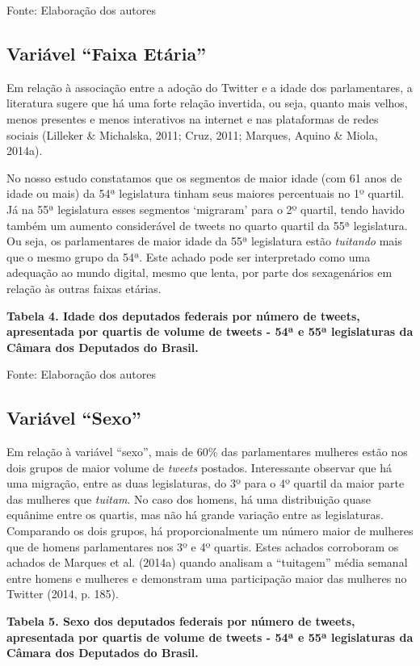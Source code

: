 Fonte: Elaboração dos autores

\subsection{Variável ``Faixa Etária''}

Em relação à associação entre a adoção do Twitter e a idade dos
parlamentares, a literatura sugere que há uma forte relação invertida,
ou seja, quanto mais velhos, menos presentes e menos interativos na
internet e nas plataformas de redes sociais (Lilleker \& Michalska,
2011; Cruz, 2011; Marques, Aquino \& Miola, 2014a).

No nosso estudo constatamos que os segmentos de maior idade (com 61 anos
de idade ou mais) da 54ª legislatura tinham seus maiores percentuais no
1º quartil. Já na 55ª legislatura esses segmentos `migraram' para o 2º
quartil, tendo havido também um aumento considerável de tweets no quarto
quartil da 55ª legislatura. Ou seja, os parlamentares de maior idade da
55ª legislatura estão \emph{tuitando} mais que o mesmo grupo da 54ª.
Este achado pode ser interpretado como uma adequação ao mundo digital,
mesmo que lenta, por parte dos sexagenários em relação às outras faixas
etárias.

\textbf{Tabela 4. Idade dos deputados federais por número de tweets,
apresentada por quartis de volume de tweets - 54ª e 55ª legislaturas da
Câmara dos Deputados do Brasil.}

Fonte: Elaboração dos autores

\subsection{Variável ``Sexo''}

Em relação à variável ``sexo'', mais de 60\% das parlamentares mulheres
estão nos dois grupos de maior volume de \emph{tweets} postados.
Interessante observar que há uma migração, entre as duas legislaturas,
do 3º para o 4º quartil da maior parte das mulheres que \emph{tuitam}.
No caso dos homens, há uma distribuição quase equânime entre os quartis,
mas não há grande variação entre as legislaturas. Comparando os dois
grupos, há proporcionalmente um número maior de mulheres que de homens
parlamentares nos 3º e 4º quartis. Estes achados corroboram os achados
de Marques et al. (2014a) quando analisam a ``tuitagem'' média semanal
entre homens e mulheres e demonstram uma participação maior das mulheres
no Twitter (2014, p. 185).

\textbf{Tabela 5. Sexo dos deputados federais por número de tweets,
apresentada por quartis de volume de tweets - 54ª e 55ª legislaturas da
Câmara dos Deputados do Brasil.}


